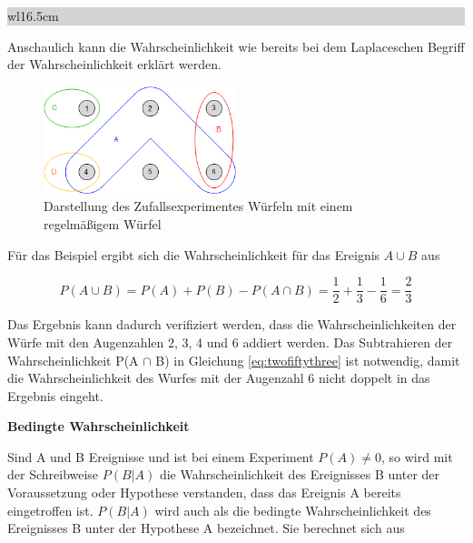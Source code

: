 \noindent
\colorbox{lightgray}{%
%
\renewcommand\arraystretch{0.6}%
\begin{tabular}{ wl{16.5cm} }
{\selectfont
{}}
\end{tabular}%
}\bigskip

\noindent Anschaulich kann die Wahrscheinlichkeit wie bereits bei dem Laplaceschen Begriff der Wahrscheinlichkeit erkl\"{a}rt werden.

\noindent 
\begin{figure}[H]
  \centerline{\includegraphics[width=0.5\textwidth]{Kapitel2/Bilder/image10}}
  \caption{Darstellung des Zufallsexperimentes Würfeln mit einem regelmäßigem Würfel}
  \label{fig:Mengen1}
\end{figure}

\noindent F\"{u}r das Beispiel ergibt sich die Wahrscheinlichkeit f\"{u}r das Ereignis $A \cup B$ aus

\begin{equation}\label{eq:twofiftythree}
P(A\cup B)=P(A)+P(B)-P(A\cap B)=\dfrac{1}{2} +\dfrac{1}{3} -\dfrac{1}{6} =\dfrac{2}{3}
\end{equation}

\noindent Das Ergebnis kann dadurch verifiziert werden, dass die Wahrscheinlichkeiten der W\"{u}rfe mit den Augenzahlen 2, 3, 4 und 6 addiert werden. Das Subtrahieren der Wahrscheinlichkeit P(A $\cap$ B) in Gleichung \eqref{eq:twofiftythree} ist notwendig, damit die Wahrscheinlichkeit des Wurfes mit der Augenzahl 6 nicht doppelt in das Ergebnis eingeht.\bigskip

{\selectfont
\noindent\textbf{Bedingte Wahrscheinlichkeit}} \smallskip

\noindent Sind A und B Ereignisse und ist bei einem Experiment $P(A) \neq 0$, so wird mit der Schreibweise $P(B|A)$ die Wahrscheinlichkeit des Ereignisses B unter der Voraussetzung oder Hypothese verstanden, dass das Ereignis A bereits eingetroffen ist. $P(B|A)$ wird auch als die bedingte Wahrscheinlichkeit des Ereignisses B unter der Hypothese A bezeichnet. Sie berechnet sich aus

